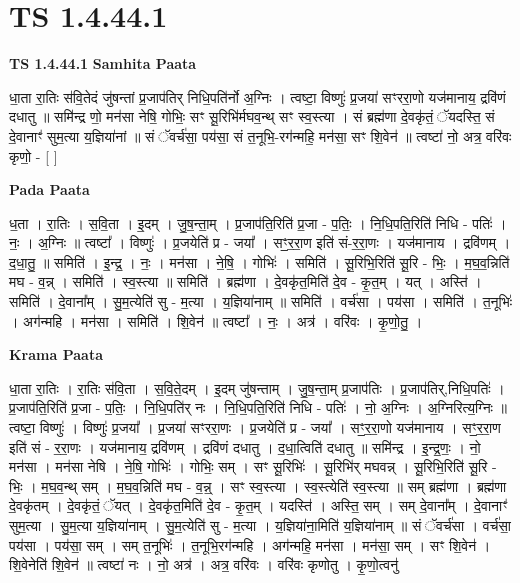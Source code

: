 \documentclass[17pt]{extarticle}
\begin{document}
\section{ TS 1.4.44.1 }

\textbf{TS 1.4.44.1 } \newline
\textbf{Samhita Paata} \newline

धा॒ता रा॒तिः स॑वि॒तेदं जु॑षन्तां प्र॒जाप॑तिर् निधि॒पति॑र्नो अ॒ग्निः । त्वष्टा॒ विष्णुः॑ प्र॒जया॑ सꣳररा॒णो यज॑मानाय॒ द्रवि॑णं दधातु ॥ समि॑न्द्र णो॒ मन॑सा नेषि॒ गोभिः॒ सꣳ सू॒रिभि॑र्मघव॒न्थ् सꣳ स्व॒स्त्या । सं ब्रह्म॑णा दे॒वकृ॑तं॒ ॅयदस्ति॒ सं दे॒वानाꣳ॑ सुम॒त्या य॒ज्ञिया॑नां ॥ सं ॅवर्च॑सा॒ पय॑सा॒ सं त॒नूभि॒-रग॑न्महि॒ मन॑सा॒ सꣳ शि॒वेन॑ ॥ त्वष्टा॑ नो॒ अत्र॒ वरि॑वः कृणो॒ - [ ] \newline

\textbf{Pada Paata} \newline

ध॒ता । रा॒तिः । स॒वि॒ता । इ॒दम् । जु॒ष॒न्ता॒म् । प्र॒जाप॑ति॒रिति॑ प्र॒जा - प॒तिः॒ । नि॒धि॒पति॒रिति॑ निधि - पतिः॑ । नः॒ । अ॒ग्निः ॥ त्वष्टा᳚ । विष्णुः॑ । प्र॒जयेति॑ प्र - जया᳚ । सꣳ॒॒र॒रा॒ण इति॑ सं-र॒रा॒णः । यज॑मानाय । द्रवि॑णम् । द॒धा॒तु॒ ॥ समिति॑ । इ॒न्द्र॒ । नः॒ । मन॑सा । ने॒षि॒ । गोभिः॑ । समिति॑ । सू॒रिभि॒रिति॑ सू॒रि - भिः॒ । म॒घ॒व॒न्निति॑ मघ - व॒न्न् । समिति॑ । स्व॒स्त्या ॥ समिति॑ । ब्रह्म॑णा । दे॒वकृ॑त॒मिति॑ दे॒व - कृ॒त॒म् । यत् । अस्ति॑ । समिति॑ । दे॒वाना᳚म् । सु॒म॒त्येति॑ सु - म॒त्या । य॒ज्ञिया॑नाम् ॥ समिति॑ । वर्च॑सा । पय॑सा । समिति॑ । त॒नूभिः॑ । अग॑न्महि । मन॑सा । समिति॑ । शि॒वेन॑ ॥ त्वष्टा᳚ । नः॒ । अत्र॑ । वरि॑वः । कृ॒णो॒तु॒ ।  \newline


\textbf{Krama Paata} \newline

धा॒ता रा॒तिः । रा॒तिः स॑वि॒ता । स॒वि॒ते॒दम् । इ॒दम् जु॑षन्ताम् । जु॒ष॒न्ता॒म् प्र॒जाप॑तिः । प्र॒जाप॑तिर्,निधि॒पतिः॑ । प्र॒जाप॑ति॒रिति॑ प्र॒जा - प॒तिः॒ । नि॒धि॒पति॑र् नः । नि॒धि॒पति॒रिति॑ निधि - पतिः॑ । नो॒ अ॒ग्निः । अ॒ग्निरित्य॒ग्निः ॥ त्वष्टा॒ विष्णुः॑ । विष्णुः॑ प्र॒जया᳚ । प्र॒जया॑ सꣳररा॒णः । प्र॒जयेति॑ प्र - जया᳚ । सꣳ॒॒र॒रा॒णो यज॑मानाय । सꣳ॒॒र॒रा॒ण इति॑ सं - र॒रा॒णः । यज॑मानाय॒ द्रवि॑णम् । द्रवि॑णं दधातु । द॒धा॒त्विति॑ दधातु ॥ समि॑न्द्र । इ॒न्द्र॒णः॒ । नो॒ मन॑सा । मन॑सा नेषि । ने॒षि॒ गोभिः॑ । गोभिः॒ सम् । सꣳ सू॒रिभिः॑ । सू॒रिभि॑र् मघवन्न् । सू॒रिभि॒रिति॑ सू॒रि - भिः॒ । म॒घ॒व॒न्थ् सम् । म॒घ॒व॒न्निति॑ मघ - व॒न्न्॒ । सꣳ स्व॒स्त्या । स्व॒स्त्येति॑ स्व॒स्त्या ॥ सम् ब्रह्म॑णा । ब्रह्म॑णा दे॒वकृ॑तम् । दे॒वकृ॑तं॒ ॅयत् । दे॒वकृ॑त॒मिति॑ दे॒व - कृ॒त॒म् । यदस्ति॑ । अस्ति॒ सम् । सम् दे॒वाना᳚म् । दे॒वानाꣳ॑ सुम॒त्या । सु॒म॒त्या य॒ज्ञिया॑नाम् । सु॒म॒त्येति॑ सु - म॒त्या । य॒ज्ञिया॑ना॒मिति॑ य॒ज्ञिया॑नाम् ॥ सं ॅवर्च॑सा । वर्च॑सा॒ पय॑सा । पय॑सा॒ सम् । सम् त॒नूभिः॑ । त॒नूभि॒रग॑न्महि । अग॑न्महि॒ मन॑सा । मन॑सा॒ सम् । सꣳ शि॒वेन॑ । शि॒वेनेति॑ शि॒वेन॑ ॥ त्वष्टा॑ नः । नो॒ अत्र॑ । अत्र॒ वरि॑वः । वरि॑वः कृणोतु । कृ॒णो॒त्वनु॑ \newline
\end{document}
